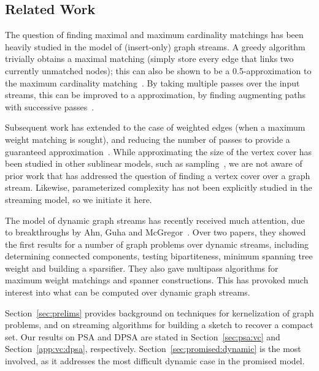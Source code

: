 \documentclass[11pt,letter]{article}
\renewcommand{\paragraph}[1]{\medskip \noindent {\bf #1}}
\begin{document}
\subsection{Related Work}

The question of finding maximal and maximum cardinality matchings has
been heavily studied in the model of (insert-only) graph streams.
A greedy algorithm trivially obtains a maximal matching (simply store
every edge that links two currently unmatched nodes); this can also be
shown to be a 0.5-approximation to the maximum cardinality matching~\cite{Feigenbaum:Kannan:McGregor:Suri:Zhang:05}.
By taking multiple passes over the input streams, this can be improved
to a  approximation, by finding augmenting paths with
successive passes~\cite{McGregor:05,McGregor:09}.

Subsequent work has extended to the case of weighted edges (when a
maximum weight matching is sought), and reducing the number of passes
to provide a guaranteed approximation~\cite{Eggert:Kliemann:Srivastav:09,Eggert:Kliemann:Munstermann:Srivastav:12}.
While approximating the size of the vertex cover has been studied in other sublinear models, such as
sampling~\cite{Parnas:Ron:07,Onak:Ron:Rosen:Rubinfeld:12}, we are not
aware of prior work that has addressed the question of finding a
vertex cover over a graph stream.
Likewise, parameterized complexity has not been explicitly studied in
the streaming model, so we initiate it here.

The model of dynamic graph streams has recently received much attention,
due to breakthroughs by Ahn, Guha and
McGregor~\cite{AGM12a,Ahn:Guha:McGregor:12PODS}.
Over two papers, they showed the first results for a number of graph
problems over dynamic streams, including
determining connected components,
testing bipartiteness,
minimum spanning tree weight and building a sparsifier.
They also gave multipass algorithms for maximum weight matchings
and spanner constructions.
This has provoked much interest into what can be computed over dynamic
graph streams.



\paragraph{Outline.}
Section~\ref{sec:prelims} provides background on techniques for
kernelization of graph problems, and on streaming algorithms for
building a sketch to recover a compact set.
Our results on PSA and DPSA are stated in Section~\ref{sec:psa:vc}
and Section~\ref{app:vc:dpsa}, respectively.
Section~\ref{sec:promised:dynamic} is the most involved, as it addresses the most
difficult dynamic case in the promised model.
\end{document}
